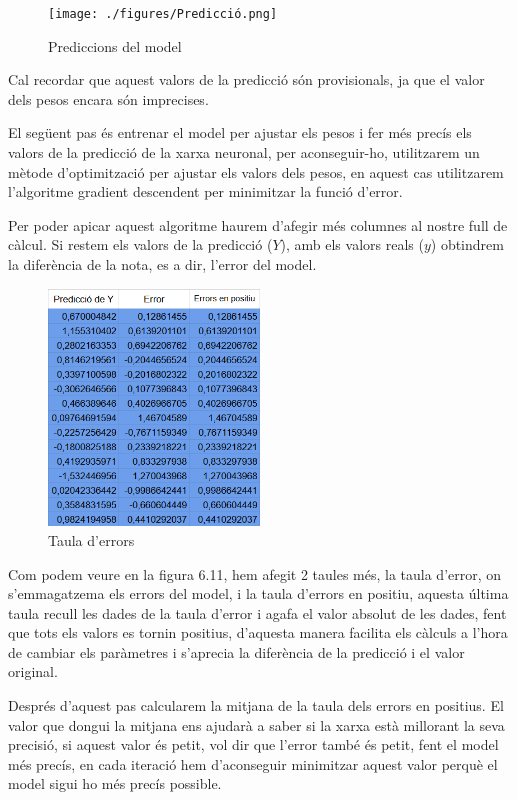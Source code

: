 \begin{figure}[H]
    \centering
    \texttt{[image: ./figures/Predicció.png]}
    \caption{Prediccions del model}
\end{figure}

Cal recordar que aquest valors de la predicció són provisionals, ja que el valor dels pesos encara són imprecises.

El següent pas és entrenar el model per ajustar els pesos i fer més precís els valors de la predicció de la xarxa neuronal, per aconseguir-ho, utilitzarem un mètode d'optimització per ajustar els valors dels pesos, en aquest cas utilitzarem l'algoritme gradient descendent per minimitzar la funció d'error.

Per poder apicar aquest algoritme haurem d'afegir més columnes al nostre full de càlcul. Si restem els valors de la predicció ($Y$), amb els valors reals ($y$) obtindrem la diferència de la nota, es a dir, l'error del model.

\begin{figure}[H]
    \centering
    \includegraphics[width=0.5\textwidth]{./figures/Errors.png}
    \caption{Taula d'errors}
\end{figure}

Com podem veure en la figura 6.11, hem afegit 2 taules més, la taula d'error, on s'emmagatzema els errors del model, i la taula d'errors en positiu, aquesta última taula recull les dades de la taula d'error i agafa el valor absolut de les dades, fent que tots els valors es tornin positius, d'aquesta manera facilita els càlculs a l'hora de cambiar els paràmetres i s'aprecia la diferència de la predicció i el valor original.

Després d'aquest pas calcularem la mitjana de la taula dels errors en positius. El valor que dongui la mitjana ens ajudarà a saber si la xarxa està millorant la seva precisió, si aquest valor és petit, vol dir que l'error també és petit, fent el model més precís, en cada iteració hem d'aconseguir minimitzar aquest valor perquè el model sigui ho més precís possible.

